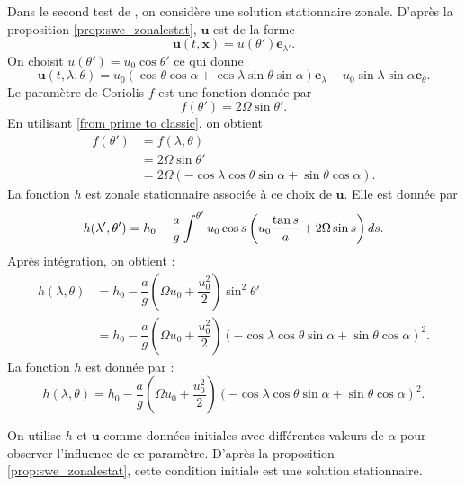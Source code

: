 Dans le second test de \cite{Williamson1992}, on considère une solution stationnaire zonale. D'après la proposition \ref{prop:swe_zonalestat}, $\mathbf{u}$ est de la forme
\begin{equation}
\mathbf{u}(t,\mathbf{x}) = u(\theta')\mathbf{e}_{\lambda'}.
\end{equation}
On choisit $u(\theta') = u_0 \cos \theta'$ ce qui donne
\begin{equation}
\mathbf{u}(t,\lambda, \theta) = u_0 \left( \cos \theta \cos \alpha + \cos \lambda \sin \theta \sin \alpha \right) \mathbf{e}_{\lambda} - u_0 \sin \lambda \sin \alpha \mathbf{e}_{\theta}.
\label{eq: williamson 2 initial velocity}
\end{equation} 
Le paramètre de Coriolis $f$ est une fonction donnée par
\begin{equation}
f(\theta') = 2 \Omega \sin \theta'.
\end{equation}
En utilisant \eqref{from prime to classic}, on obtient
\begin{align*}
f(\theta') & = f (\lambda, \theta)\\
	& = 2 \Omega \sin \theta' \\
	& = 2 \Omega \left( - \cos \lambda \cos \theta \sin \alpha + \sin \theta \cos \alpha \right).
\end{align*}
La fonction $h$ est zonale stationnaire associée à ce choix de $\mathbf{u}$. Elle est donnée par
\begin{equation}
h(\lambda', \theta') = h_0 - \dfrac{a}{g} \displaystyle\int^{\theta'} u_0 \cos s \left( u_0 \dfrac{\tan s}{a} + 2 \Omega \sin s \right) d s.
\end{equation}
Après intégration, on obtient :
\begin{align*}
h(\lambda, \theta) & = h_0 - \dfrac{a}{g} \left( \Omega u_0 + \dfrac{u_0^2}{2} \right) \sin^2 \theta' \\
                   & = h_0 - \dfrac{a}{g} \left( \Omega u_0 + \dfrac{u_0^2}{2} \right) \left( - \cos \lambda \cos \theta \sin \alpha + \sin \theta \cos \alpha \right)^2.
\end{align*}
La fonction $h$ est donnée par :
\begin{equation}
h(\lambda, \theta)= h_0 - \dfrac{a}{g} \left( \Omega u_0 + \dfrac{u_0^2}{2} \right) \left( - \cos \lambda \cos \theta \sin \alpha + \sin \theta \cos \alpha \right)^2.
\label{eq: williamson 2 initial height}
\end{equation}

On utilise $h$ et $\mathbf{u}$ comme données initiales avec différentes valeurs de $\alpha$ pour observer l'influence de ce paramètre. D'après la proposition \ref{prop:swe_zonalestat}, cette condition initiale est une solution stationnaire.

